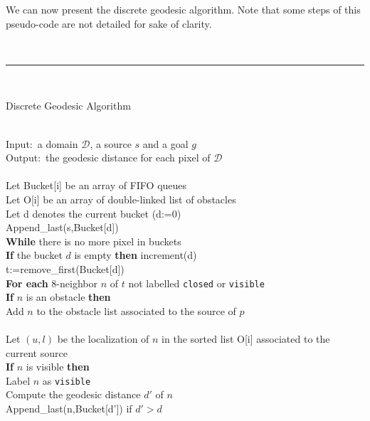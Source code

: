 \documentclass[fleqn,twoside]{article}
\begin{document}
We  can now present the discrete  geodesic algorithm.  Note that some
steps of this pseudo-code are not detailed for sake of clarity.

\ \\
{\small \hrule 
\ \\
\centerline{\textsf{Discrete Geodesic Algorithm}}\\
{\sf
Input:~a domain $\mathcal{D}$, a source $s$ and a goal $g$\\
Output:~the geodesic distance for each pixel of $\mathcal{D}$\\
\ \\
Let Bucket[i] be an array of FIFO queues\\
Let O[i] be an array of double-linked list of obstacles\\
Let d denotes the current bucket (d:=0)\\
Append\_last(s,Bucket[d])\\
{\bf While} there is no more pixel in buckets\\
\hspace*{0.5cm} {\bf If} the bucket $d$ is empty {\bf then }  increment(d)\\
\hspace*{0.5cm} t:=remove\_first(Bucket[d])\\
\hspace*{0.5cm} {\bf For each} 8-neighbor $n$ of $t$ not labelled {\tt closed} or {\tt visible}\\
\hspace*{1cm} {\bf If} $n$ is an obstacle {\bf then}\\
\hspace*{1.5cm} Add $n$ to the obstacle list associated to the source of $p$\\
\hspace*{1cm}{\bf else}\\ 
\hspace*{1.5cm} Let $(u,l)$ be the localization of $n$ in the sorted list O[i] associated to the
current source\\
\hspace*{1.5cm} {\bf If} $n$ is visible {\bf then }\\
\hspace*{2cm} Label $n$ as {\tt visible}\\
\hspace*{2cm} Compute the geodesic distance $d'$ of $n$\\
\hspace*{2cm} Append\_last(n,Bucket[d']) if $d'>d$\\
}}
\end{document}
